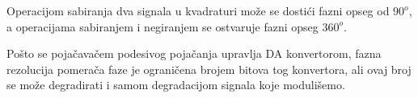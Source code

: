 \documentclass[journal,twocolumn,letterpaper]{IEEEJERM}
\begin{document}
Operacijom sabiranja dva signala u kvadraturi može se dostići fazni opseg od $90^o$, a operacijama sabiranjem i negiranjem se ostvaruje fazni opseg $360^o$.






Pošto se pojačavačem podesivog pojačanja upravlja DA konvertorom, fazna rezolucija pomerača faze je ograničena brojem bitova tog konvertora, ali ovaj broj se može degradirati i samom degradacijom signala koje modulišemo. \\







\end{document}
